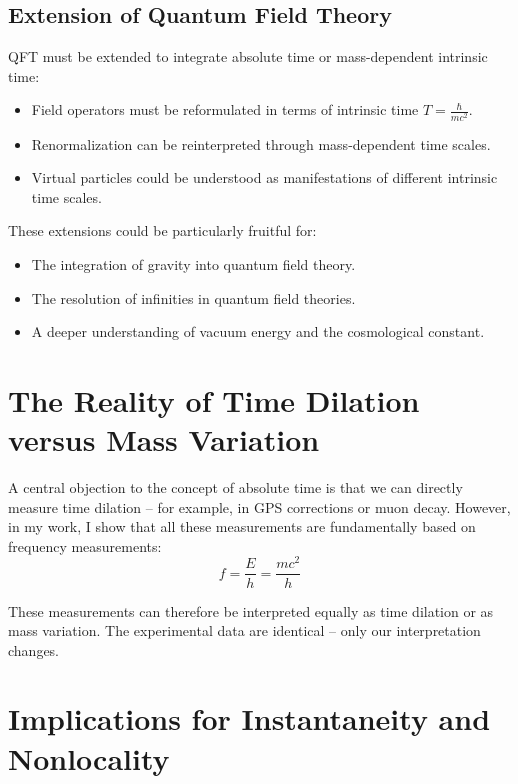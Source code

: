 \documentclass[a4paper,12pt]{article}
\begin{document}
	\subsection{Extension of Quantum Field Theory}
	
	QFT must be extended to integrate absolute time or mass-dependent intrinsic time:
	
	\begin{itemize}
		\item Field operators must be reformulated in terms of intrinsic time $T = \frac{\hbar}{mc^2}$.
		\item Renormalization can be reinterpreted through mass-dependent time scales.
		\item Virtual particles could be understood as manifestations of different intrinsic time scales.
	\end{itemize}
	
	These extensions could be particularly fruitful for:
	\begin{itemize}
		\item The integration of gravity into quantum field theory.
		\item The resolution of infinities in quantum field theories.
		\item A deeper understanding of vacuum energy and the cosmological constant.
	\end{itemize}
	
	\section{The Reality of Time Dilation versus Mass Variation}
	
	A central objection to the concept of absolute time is that we can directly measure time dilation -- for example, in GPS corrections or muon decay. However, in my work, I show that all these measurements are fundamentally based on frequency measurements:
	\begin{equation}
		f = \frac{E}{h} = \frac{mc^2}{h}
	\end{equation}
	
	These measurements can therefore be interpreted equally as time dilation or as mass variation. The experimental data are identical -- only our interpretation changes.
	
	\section{Implications for Instantaneity and Nonlocality}
	
\end{document}
